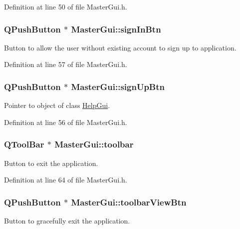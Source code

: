 Definition at line 50 of file Master\-Gui.\-h.

\hypertarget{class_master_gui_a8b3fc4f2269e8008029324f3db8ffd0d}{
\subsubsection[{sign\-In\-Btn}]{\setlength{\rightskip}{0pt plus 5cm}Q\-Push\-Button $\ast$ Master\-Gui\-::sign\-In\-Btn\hspace{0.3cm}{\ttfamily [private]}}}\label{class_master_gui_a8b3fc4f2269e8008029324f3db8ffd0d}
Button to allow the user without existing account to sign up to application. 

Definition at line 57 of file Master\-Gui.\-h.

\hypertarget{class_master_gui_a0b4ddda3b20813ac902b738baae4124a}{
\subsubsection[{sign\-Up\-Btn}]{\setlength{\rightskip}{0pt plus 5cm}Q\-Push\-Button $\ast$ Master\-Gui\-::sign\-Up\-Btn\hspace{0.3cm}{\ttfamily [private]}}}\label{class_master_gui_a0b4ddda3b20813ac902b738baae4124a}
Pointer to object of class \hyperlink{class_help_gui}{Help\-Gui}. 

Definition at line 56 of file Master\-Gui.\-h.

\hypertarget{class_master_gui_a6851c8e7db4c00bf92b68e10409972f2}{
\subsubsection[{toolbar}]{\setlength{\rightskip}{0pt plus 5cm}Q\-Tool\-Bar $\ast$ Master\-Gui\-::toolbar\hspace{0.3cm}{\ttfamily [private]}}}\label{class_master_gui_a6851c8e7db4c00bf92b68e10409972f2}
Button to exit the application. 

Definition at line 64 of file Master\-Gui.\-h.

\hypertarget{class_master_gui_a4fa8c1b03f48b75cad73d56e47ec5271}{
\subsubsection[{toolbar\-View\-Btn}]{\setlength{\rightskip}{0pt plus 5cm}Q\-Push\-Button $\ast$ Master\-Gui\-::toolbar\-View\-Btn\hspace{0.3cm}{\ttfamily [private]}}}\label{class_master_gui_a4fa8c1b03f48b75cad73d56e47ec5271}
Button to gracefully exit the application. 

